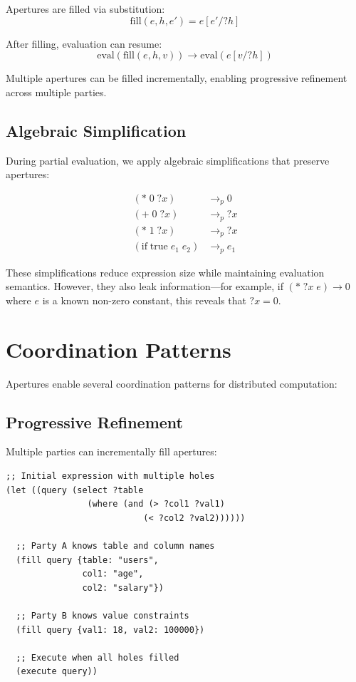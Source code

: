 \documentclass[10pt]{article}
\begin{document}
Apertures are filled via substitution:
$$\text{fill}(e, h, e') = e[e'/\texttt{?}h]$$

After filling, evaluation can resume:
$$\text{eval}(\text{fill}(e, h, v)) \rightarrow \text{eval}(e[v/\texttt{?}h])$$

Multiple apertures can be filled incrementally, enabling progressive refinement across multiple parties.

\subsection{Algebraic Simplification}

During partial evaluation, we apply algebraic simplifications that preserve apertures:

\begin{align}
(* \; 0 \; \texttt{?}x) &\rightarrow_p 0 \\
(+ \; 0 \; \texttt{?}x) &\rightarrow_p \texttt{?}x \\
(* \; 1 \; \texttt{?}x) &\rightarrow_p \texttt{?}x \\
(\text{if} \; \text{true} \; e_1 \; e_2) &\rightarrow_p e_1
\end{align}

These simplifications reduce expression size while maintaining evaluation semantics. However, they also leak information—for example, if $(* \; \texttt{?}x \; e) \rightarrow 0$ where $e$ is a known non-zero constant, this reveals that $\texttt{?}x = 0$.

\section{Coordination Patterns}

Apertures enable several coordination patterns for distributed computation:

\subsection{Progressive Refinement}

Multiple parties can incrementally fill apertures:

\begin{lstlisting}
;; Initial expression with multiple holes
(let ((query (select ?table
                (where (and (> ?col1 ?val1)
                           (< ?col2 ?val2))))))

  ;; Party A knows table and column names
  (fill query {table: "users",
               col1: "age",
               col2: "salary"})

  ;; Party B knows value constraints
  (fill query {val1: 18, val2: 100000})

  ;; Execute when all holes filled
  (execute query))
\end{lstlisting}
\end{document}
